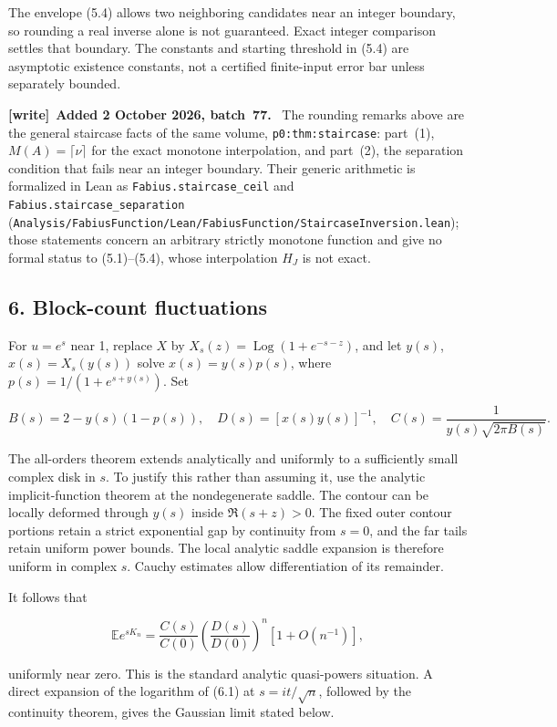 \documentclass[11pt,letterpaper]{article}
\newcommand{\Log}{\operatorname{Log}}
\newenvironment{writenote}[1][]{\par\smallskip\begingroup\small
 \noindent\textbf{[write]}\if\relax\detokenize{#1}\relax\else~\textbf{#1.}\fi\ }%
 {\par\endgroup\smallskip}
\numberwithin{equation}{subsection}
\theoremstyle{definition}
\theoremstyle{remark}
\theoremstyle{plain}
\begin{document}
The envelope (5.4) allows two neighboring candidates near an integer boundary, so rounding a real inverse alone is not guaranteed. Exact integer comparison settles that boundary. The constants and starting threshold in (5.4) are asymptotic existence constants, not a certified finite-input error bar unless separately bounded.

\begin{writenote}[Added 2 October 2026, batch~77]
The rounding remarks above are the general staircase facts of the same
volume, \texttt{p0:thm:staircase}: part~(1), \(M(A)=\lceil\nu\rceil\) for
the exact monotone interpolation, and part~(2), the separation condition
that fails near an integer boundary. Their generic arithmetic is formalized
in Lean as \texttt{Fabius.staircase\_ceil} and
\texttt{Fabius.staircase\_separation}
(\nolinkurl{Analysis/FabiusFunction/Lean/FabiusFunction/StaircaseInversion.lean});
those statements concern an arbitrary strictly monotone function and give
no formal status to (5.1)--(5.4), whose interpolation \(H_J\) is not exact.
\end{writenote}

\subsection{6. Block-count fluctuations}\label{a122:block-count-fluctuations}

For \(u=e^s\) near 1, replace \(X\) by \(X_s(z)=\Log(1+e^{-s-z})\), and let \(y(s)\), \(x(s)=X_s(y(s))\) solve \(x(s)=y(s)p(s)\), where \(p(s)=1/(1+e^{s+y(s)})\). Set

\[
 B(s)=2-y(s)(1-p(s)),\quad D(s)=[x(s)y(s)]^{-1},
 \quad C(s)=\frac1{y(s)\sqrt{2\pi B(s)}}.
\]

The all-orders theorem extends analytically and uniformly to a sufficiently small complex disk in \(s\). To justify this rather than assuming it, use the analytic implicit-function theorem at the nondegenerate saddle. The contour can be locally deformed through \(y(s)\) inside \(\Re(s+z)>0\). The fixed outer contour portions retain a strict exponential gap by continuity from \(s=0\), and the far tails retain uniform power bounds. The local analytic saddle expansion is therefore uniform in complex \(s\). Cauchy estimates allow differentiation of its remainder.

It follows that

\[
 \mathbb E e^{sK_n}=\frac{C(s)}{C(0)}
 \left(\frac{D(s)}{D(0)}\right)^n[1+O(n^{-1})],\tag{6.1}
\]

uniformly near zero. This is the standard analytic quasi-powers situation. A direct expansion of the logarithm of (6.1) at \(s=it/\sqrt n\), followed by the continuity theorem, gives the Gaussian limit stated below.
\end{document}
